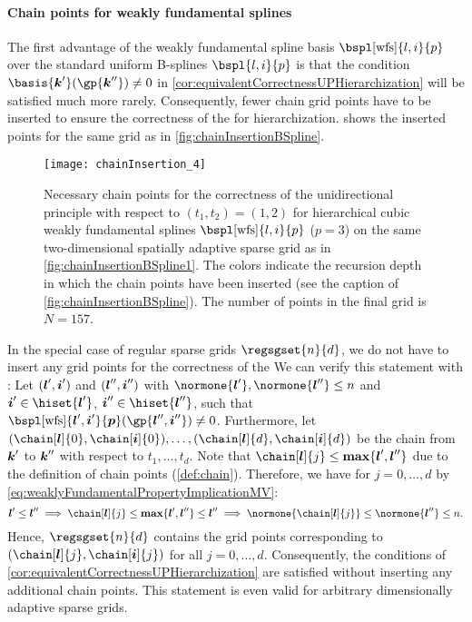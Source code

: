 \paragraph{Chain points for weakly fundamental splines}

The first advantage of the
weakly fundamental spline basis $\bspl[\wfs]{l,i}{p}$
over the standard uniform B-splines $\bspl{l,i}{p}$ is that
the condition $\basis{\*k'}(\gp{\*k''}) \not= 0$ in
\cref{cor:equivalentCorrectnessUPHierarchization} will be
satisfied much more rarely.
Consequently, fewer chain grid points have to be inserted to
ensure the correctness of the \up for hierarchization.
 shows the inserted points
for the same grid as in \cref{fig:chainInsertionBSpline}.

\begin{SCfigure}
  \texttt{[image: chainInsertion\_4]}%
  \caption[%
    Chain points for hierarchical weakly fundamental splines on a
    sparse grid%
  ]{%
    Necessary chain points for the correctness of the unidirectional principle
    with respect to $(t_1, t_2) = (1, 2)$
    for hierarchical cubic weakly fundamental splines
    $\bspl[\wfs]{l,i}{p}$ ($p = 3$)
    on the same two-dimensional spatially adaptive sparse grid
    as in \cref{fig:chainInsertionBSpline1}.
    The colors indicate the recursion depth in which the
    chain points have been inserted
    (see the caption of \cref{fig:chainInsertionBSpline}).
    The number of points in the final grid is $N = 157$.%
  }%
  \label{fig:chainInsertionWeaklyFundamentalSpline}%
\end{SCfigure}

In the special case of regular sparse grids $\regsgset{n}{d}$,
we do not have to insert any grid points for the correctness of the
\up{}
We can verify this statement with
:
Let $({\boldsymbol{l}}',{\boldsymbol{i}}')$ and $({\boldsymbol{l}}'',{\boldsymbol{i}}'')$ with
$\normone{\*l'}, \normone{\*l''} \le n$ and
$\*i' \in \hiset{\*l'}$, $\*i'' \in \hiset{\*l''}$,
such that $\bspl[\wfs]{\*l',\*i'}{\*p}(\gp{\*l'',\*i''}) \not= 0$.
Furthermore, let $(\chain[\*l]{0}, \chain[\*i]{0}), \dotsc,
(\chain[\*l]{d}, \chain[\*i]{d})$ be the chain
from ${\boldsymbol{k}}'$ to ${\boldsymbol{k}}''$ with respect to $t_1, \dotsc, t_d$.
Note that $\chain[\*l]{j} \le \vecmax\{\*l', \*l''\}$ due to the
definition of chain points (\cref{def:chain}).
Therefore, we have for $j = 0, \dotsc, d$
by \eqref{eq:weaklyFundamentalPropertyImplicationMV}:
\begin{equation}
  \*l' \le \*l''
  \implies
  \chain[\*l]{j} \le \vecmax\{\*l', \*l''\} \le \*l''
  \implies
  \normone{\chain[\*l]{j}} \le \normone{\*l''} \le n.
\end{equation}
Hence, $\regsgset{n}{d}$ contains the grid points corresponding to
$(\chain[\*l]{j}, \chain[\*i]{j})$ for all $j = 0, \dotsc, d$.
Consequently, the conditions of
\cref{cor:equivalentCorrectnessUPHierarchization} are satisfied without
inserting any additional chain points.
This statement is even valid for arbitrary
dimensionally adaptive sparse grids.



